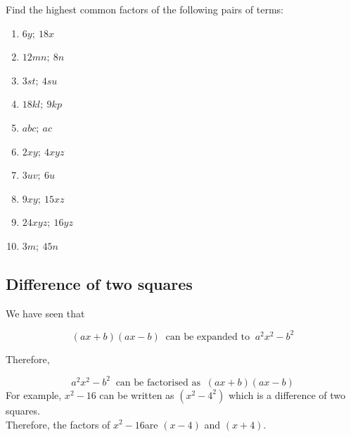 \begin{exercises}{}

Find the highest common factors of the
following pairs of terms:\par

\begin{multicols}{2}
\begin{enumerate}[label=\textbf{\arabic*}., itemsep=5pt]
\item $6y;~18x$
\item $12mn;~8n$
\item $3st;~4su$ 
\item $18kl;~9kp$
\item $abc;~ac$%
\item $2xy;~4xyz$
\item $3uv;~6u$ 
\item $9xy;~15xz$
\item $24xyz;~16yz$
\item $3m;~45n$
\end{enumerate}
\end{multicols}



\end{exercises}
\par
\label{m39383*uid7}
\subsection* {Difference of two squares}
\nopagebreak
\label{m39383*id269179}We have seen that\par 
\label{m39383*uid8}\nopagebreak\noindent{}

\begin{equation*}
\left(ax+b\right)\left(ax-b\right)~\mbox{ can be expanded to }~{a}^{2}{x}^{2}-{b}^{2}
\end{equation*}

\label{m39383*id269338}Therefore,\par 
\label{m39383*id269343}\nopagebreak\noindent{}

\begin{equation*}
{a}^{2}{x}^{2}-{b}^{2}~\mbox{ can be factorised as }~\left(ax+b\right)\left(ax-b\right)
\end{equation*}
\label{m39383*id269408}For example, ${x}^{2}-16$\hspace{1ex} can be written as $\left({x}^{2}-{4}^{2}\right)$ which is a difference of two squares. \\Therefore, the factors of ${x}^{2}-16$\hspace{1ex}are $\left(x-4\right)$ and $\left(x+4\right)$.\par 


